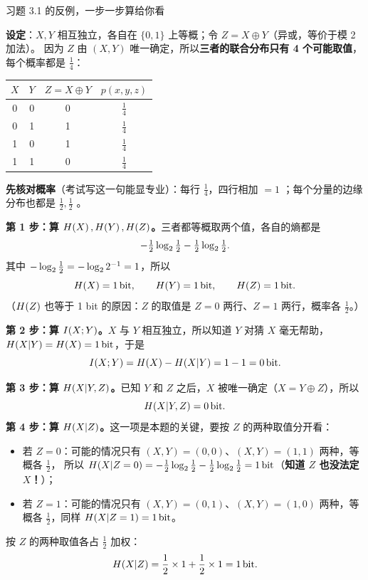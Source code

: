 \documentclass[11pt,a4paper]{ctexart}
\begin{document}
\begin{calc}{习题 3.1 的反例，一步一步算给你看}

\textbf{设定}：$X,Y$ 相互独立，各自在 $\{0,1\}$ 上等概；令 $Z=X\oplus Y$（异或，等价于模 2 加法）。
因为 $Z$ 由 $(X,Y)$ 唯一确定，所以\textbf{三者的联合分布只有 4 个可能取值}，每个概率都是 $\frac14$：

\begin{center}
\renewcommand{\arraystretch}{1.35}
\begin{tabular}{c|c|c|c}
\toprule
$X$ & $Y$ & $Z=X\oplus Y$ & $p(x,y,z)$ \\
\midrule
0 & 0 & 0 & $\frac14$ \\
0 & 1 & 1 & $\frac14$ \\
1 & 0 & 1 & $\frac14$ \\
1 & 1 & 0 & $\frac14$ \\
\bottomrule
\end{tabular}
\end{center}

\textbf{先核对概率}（考试写这一句能显专业）：每行 $\frac14$，四行相加 $=1$ \checkmark；每个分量的边缘分布也都是 $\frac12,\frac12$ \checkmark。

\textbf{第 1 步：算 $H\!\left(X\right),H\!\left(Y\right),H\!\left(Z\right)$。}三者都等概取两个值，各自的熵都是
\[
-\tfrac12\log_{2}\tfrac12-\tfrac12\log_{2}\tfrac12 .
\]
其中 $-\log_{2}\tfrac12=-\log_{2} 2^{-1}=1$，所以
\[
H\!\left(X\right)=1\,\text{bit},\qquad H\!\left(Y\right)=1\,\text{bit},\qquad H\!\left(Z\right)=1\,\text{bit} .
\]
（$H\!\left(Z\right)$ 也等于 1 bit 的原因：$Z$ 的取值是 $Z=0$ 两行、$Z=1$ 两行，概率各 $\frac12$。）

\textbf{第 2 步：算 $I\!\left(X;Y\right)$。}$X$ 与 $Y$ 相互独立，所以知道 $Y$ 对猜 $X$ 毫无帮助，$H\!\left(X|Y\right)=H\!\left(X\right)=1\,\text{bit}$，于是
\[
I\!\left(X;Y\right)=H\!\left(X\right)-H\!\left(X|Y\right)=1-1=0\,\text{bit} .
\]

\textbf{第 3 步：算 $H\!\left(X|Y,Z\right)$。}已知 $Y$ 和 $Z$ 之后，$X$ 被唯一确定（$X=Y\oplus Z$），所以
\[
H\!\left(X|Y,Z\right)=0\,\text{bit} .
\]
\textbf{第 4 步：算 $H\!\left(X|Z\right)$。}这一项是本题的关键，要按 $Z$ 的两种取值分开看：
\begin{itemize}[leftmargin=1.5em,itemsep=1pt,topsep=1pt]
  \item 若 $Z=0$：可能的情况只有 $(X,Y)=(0,0)$、$(X,Y)=(1,1)$ 两种，等概各 $\frac12$，
        所以 $H\!\left(X|Z=0\right)=-\tfrac12\log_{2}\tfrac12-\tfrac12\log_{2}\tfrac12=1\,\text{bit}$（\textbf{知道 $Z$ 也没法定 $X$！}）；
  \item 若 $Z=1$：可能的情况只有 $(X,Y)=(0,1)$、$(X,Y)=(1,0)$ 两种，等概各 $\frac12$，同样 $H\!\left(X|Z=1\right)=1\,\text{bit}$。
\end{itemize}
按 $Z$ 的两种取值各占 $\frac12$ 加权：
\[
H\!\left(X|Z\right)=\frac12\times1+\frac12\times1=1\,\text{bit} .
\]


\end{calc}
\end{document}
